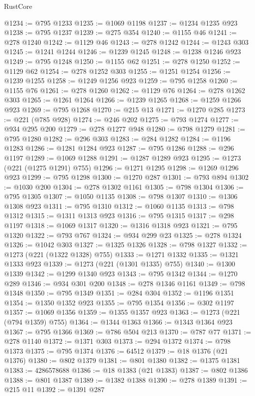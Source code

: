 \begin{lexlean}{RustCore}
\begin{coremodule}
@1234 := @795 @1233
@1235 := @1069 @1198
@1237 := @1234 @1235 @923
@1238 := @795 @1237
@1239 := @275 @354
@1240 := @1155 @46
@1241 := @278 @1240
@1242 := @1129 @46
@1243 := @278 @1242
@1244 := @1243 @303
@1245 := @1241 @1244
@1246 := @1239 @1245
@1248 := @1238 @1246 @923
@1249 := @795 @1248
@1250 := @1155 @62
@1251 := @278 @1250
@1252 := @1129 @62
@1254 := @278 @1252 @303
@1255 := @1251 @1254
@1256 := @1239 @1255
@1258 := @1249 @1256 @923
@1259 := @795 @1258
@1260 := @1155 @76
@1261 := @278 @1260
@1262 := @1129 @76
@1264 := @278 @1262 @303
@1265 := @1261 @1264
@1266 := @1239 @1265
@1268 := @1259 @1266 @923
@1269 := @795 @1268
@1270 := @215 @13
@1271 := @1270 @285
@1273 := @221 (@785 @928)
@1274 := @246 @202
@1275 := @793 @1274
@1277 := @934 @295 @200
@1279 := @278 @1277 @948
@1280 := @798 @1279
@1281 := @795 @1280
@1282 := @296 @303
@1283 := @284 @1282
@1284 := @1196 @1283
@1286 := @1281 @1284 @923
@1287 := @795 @1286
@1288 := @296 @1197
@1289 := @1069 @1288
@1291 := @1287 @1289 @923
@1295 := @1273 (@221 (@1275 @1291) @755)
@1296 := @1271 @1295
@1298 := @1269 @1296 @923
@1299 := @795 @1298
@1300 := @1270 @287
@1301 := @793 @894
@1302 := @1030 @200
@1304 := @278 @1302 @1161
@1305 := @798 @1304
@1306 := @795 @1305
@1307 := @1050 @1135
@1308 := @798 @1307
@1310 := @1306 @1308 @923
@1311 := @795 @1310
@1312 := @1060 @1135
@1313 := @798 @1312
@1315 := @1311 @1313 @923
@1316 := @795 @1315
@1317 := @298 @1197
@1318 := @1069 @1317
@1320 := @1316 @1318 @923
@1321 := @795 @1320
@1322 := @793 @767
@1324 := @934 @299 @23
@1325 := @278 @1324
@1326 := @1042 @303
@1327 := @1325 @1326
@1328 := @798 @1327
@1332 := @1273 (@221 (@1322 @1328) @755)
@1333 := @1271 @1332
@1335 := @1321 @1333 @923
@1339 := @1273 (@221 (@1301 @1335) @755)
@1340 := @1300 @1339
@1342 := @1299 @1340 @923
@1343 := @795 @1342
@1344 := @1270 @289
@1346 := @934 @301 @200
@1348 := @278 @1346 @1161
@1349 := @798 @1348
@1350 := @795 @1349
@1351 := @284 @304
@1352 := @1196 @1351
@1354 := @1350 @1352 @923
@1355 := @795 @1354
@1356 := @302 @1197
@1357 := @1069 @1356
@1359 := @1355 @1357 @923
@1363 := @1273 (@221 (@794 @1359) @755)
@1364 := @1344 @1363
@1366 := @1343 @1364 @923
@1367 := @795 @1366
@1369 := @786 @504 @213
@1370 := @787 @77
@1371 := @278 @1140
@1372 := @1371 @303
@1373 := @294 @1372
@1374 := @798 @1373
@1375 := @795 @1374
@1376 := 64512
@1379 := @18 @1376 (@21 @1376)
@1380 := @802 @1379
@1381 := @801 @1380
@1382 := @1375 @1381
@1383 := 4286578688
@1386 := @18 @1383 (@21 @1383)
@1387 := @802 @1386
@1388 := @801 @1387
@1389 := @1382 @1388
@1390 := @278 @1389
@1391 := @215 @11
@1392 := @1391 @287

\end{coremodule}
\end{lexlean}
